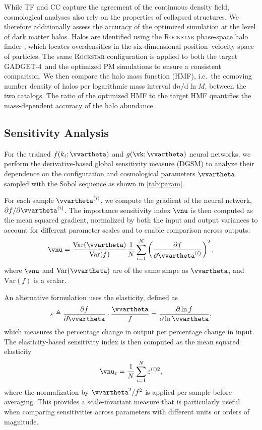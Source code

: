 \documentclass[modern, trackchanges, dvipsnames]{aastex631}
\newcommand{\GADGET}{{{\fontsize{10pt}{12pt}\selectfont GADGET}-4}}
\begin{document}
While TF and CC capture the agreement of the continuous density field,
cosmological analyses also rely on the properties of collapsed
structures.
We therefore additionally assess the accuracy of the optimized
simulation at the level of dark matter halos.
Halos are identified using the \textsc{Rockstar} phase-space halo
finder \citep{Behroozi2013}, which locates overdensities in the
six-dimensional position--velocity space of particles.
The same \textsc{Rockstar} configuration is applied to both the target
\GADGET\ and the optimized PM simulations to ensure a consistent
comparison.
We then compare the halo mass function (HMF),
i.e.\ the comoving number density of halos per logarithmic mass interval
$\mathrm{d}n / \mathrm{d}\ln M$, between the two catalogs.
The ratio of the optimized HMF to the target HMF quantifies the
mass-dependent accuracy of the halo abundance.


\vspace{1em}
\subsection{Sensitivity Analysis}
\label{sec:sensitivity}
For the trained $f(k_i; \vvartheta)$ and $g(\vk; \vvartheta)$ neural
networks, we perform the derivative-based global sensitivity measure
(DGSM) to analyze their dependence on the configuration and cosmological
parameters $\vvartheta$ sampled with the Sobol sequence as shown in
\autoref{tab:param}.

For each sample $\vvartheta^{(i)}$, we compute the gradient of the neural
network, $\partial f / \partial \vvartheta^{(i)}$.
The importance sensitivity index $\vnu$ is then computed as the mean
squared gradient, normalized by both the input and output variances to
account for different parameter scales and to enable comparison across
outputs:
\begin{equation}
\vnu = \frac{\mathrm{Var}(\vvartheta)}{\mathrm{Var}(f)} \frac{1}{N} \sum_{i=1}^{N}
  \left(\frac{\partial f}{\partial \vvartheta^{(i)}}\right)^2,
\end{equation}
where $\vnu$ and $\mathrm{Var}(\vvartheta)$ are of the same shape as $\vvartheta$,
and $\mathrm{Var}(f)$ is a scalar.

An alternative formulation uses the elasticity, defined as
\begin{equation}
\varepsilon \triangleq \frac{\partial f}{\partial \vvartheta} \cdot \frac{\vvartheta}{f}
= \frac{\partial \ln f}{\partial \ln \vvartheta},
\end{equation}
which measures the percentage change in output per percentage change in input.
The elasticity-based sensitivity index is then computed as the mean squared
elasticity
\begin{equation}
\vnu_\varepsilon = \frac{1}{N} \sum_{i=1}^{N} \varepsilon^{(i)2},
\end{equation}
where the normalization by $\vvartheta^2/f^2$ is applied per sample before
averaging. This provides a scale-invariant measure that is particularly useful
when comparing sensitivities across parameters with different units or orders
of magnitude.
\end{document}
